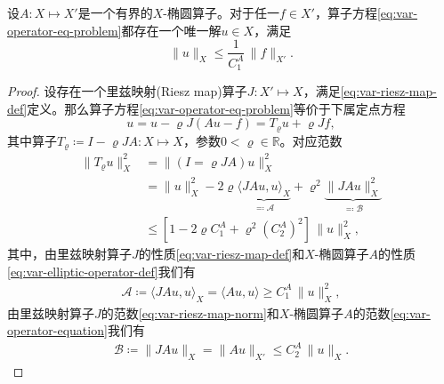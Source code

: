 \begin{theorem}[拉克斯一密格拉蒙定理]
  \label{theorem:lax-milgram-lemma}
  设$A:X \mapsto X'$是一个有界的$X$-椭圆算子。对于任一$f \in X'$，算子方程\eqref{eq:var-operator-eq-problem}都存在一个唯一解$u \in X$，满足
  \begin{equation}
    \label{eq:lax-milgram-sulution-u}
    \| u \|_{X} \le \frac{1}{C_1^A} \, \| f \|_{X'}.
  \end{equation}
\end{theorem}
\begin{proof}
  设存在一个里兹映射(Riesz map)算子$J:X' \mapsto X$，满足\eqref{eq:var-riesz-map-def}定义。那么算子方程\eqref{eq:var-operator-eq-problem}等价于下属定点方程
  \begin{equation*}
    u = u - \varrho J \left( A u - f \right) = T_{\varrho} u + \varrho J f,
  \end{equation*}
其中算子$T_{\varrho} \coloneqq I - \varrho J A : X \mapsto X$，参数$0 < \varrho \in \mathbb{R}$。对应范数
\begin{equation}
  \label{eq:var-lax-milgram-operator-tvarrho}
  \begin{split}
    \big\| T_{\varrho} u \big\|_{X}^2 &= \big\| (I = \varrho J A ) u \big\|_{X}^2 \\
    &= \big\| u \big\|_{X}^2 - 2 \varrho \underbrace{\langle JAu, u \rangle_{X}}_{\eqqcolon \mathcal{A}} + \varrho^2 \underbrace{\big\| JAu\big\|_X^2}_{\eqqcolon \mathcal{B}} \\
    & \le \left[1 - 2 \varrho C_1^A + \varrho^2 \left( C_2^A \right)^2 \right] \, \big\| u \big\|_{X}^2,
  \end{split}
\end{equation}
其中，由里兹映射算子$J$的性质\eqref{eq:var-riesz-map-def}和$X$-椭圆算子$A$的性质\eqref{eq:var-elliptic-operator-def}我们有
\begin{equation*}
  \begin{split}
    \mathcal{A} \coloneqq \langle JAu, u \rangle_{X} = \langle A u, u \rangle \ge C_1^A \, \| u \|_{X}^2,
  \end{split}
\end{equation*}
由里兹映射算子$J$的范数\eqref{eq:var-riesz-map-norm}和$X$-椭圆算子$A$的范数\eqref{eq:var-operator-equation}我们有
\begin{equation*}
  \begin{split}
    \mathcal{B} \coloneqq \big\| J A u \big\|_{X} = \big\| A u \big\|_{X'} \le C_2^A \, \| u \|_{X}.
  \end{split}
\end{equation*}


\end{proof}
